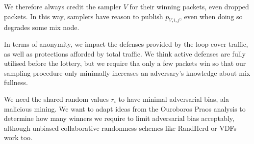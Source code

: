 ﻿\documentclass{sig-alternate-hotpets}
\begin{document}
We therefore always credit the sampler $V$ for their winning packets,
even dropped packets.  In this way, samplers have reason to publish
$p_{V,i,j}$, even when doing so degrades some mix node.

\smallskip

In terms of anonymity, we impact the defenses provided by the loop cover traffic, as well as protections afforded by total traffic.  We think active defenses are fully utilised before the lottery, but we require tha only a few packets win so that our sampling procedure only minimally increases an adversary's knowledge about mix fullness. 

We need the shared random values $r_i$ to have minimal adversarial bias, ala malicious mining.  We want to adapt ideas from the Ouroboros Praos \cite{OuroborosPraos} analysis to determine how many winners we require to limit adversarial bias acceptably, although unbiased collaborative randomness schemes like RandHerd or VDFs work too.

\small


\end{document}
